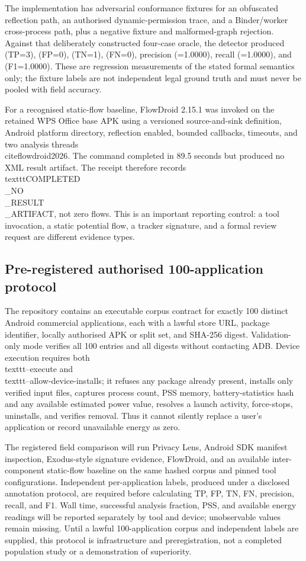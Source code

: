 The implementation has adversarial conformance fixtures for an obfuscated reflection path, an authorised dynamic-permission trace, and a Binder/worker cross-process path, plus a negative fixture and malformed-graph rejection. Against that deliberately constructed four-case oracle, the detector produced (TP=3), (FP=0), (TN=1), (FN=0), precision (=1.0000), recall (=1.0000), and (F1=1.0000). These are regression measurements of the stated formal semantics only; the fixture labels are not independent legal ground truth and must never be pooled with field accuracy.

For a recognised static-flow baseline, FlowDroid 2.15.1 was invoked on the retained WPS Office base APK using a versioned source-and-sink definition, Android platform directory, reflection enabled, bounded callbacks, timeouts, and two analysis threads \\cite{flowdroid2026}. The command completed in 89.5 seconds but produced no XML result artifact. The receipt therefore records \\texttt{COMPLETED\\_NO\\_RESULT\\_ARTIFACT}, not zero flows. This is an important reporting control: a tool invocation, a static potential flow, a tracker signature, and a formal review request are different evidence types.

\subsection{Pre-registered authorised 100-application protocol}

The repository contains an executable corpus contract for exactly 100 distinct Android commercial applications, each with a lawful store URL, package identifier, locally authorised APK or split set, and SHA-256 digest. Validation-only mode verifies all 100 entries and all digests without contacting ADB. Device execution requires both \\texttt{--execute} and \\texttt{--allow-device-installs}; it refuses any package already present, installs only verified input files, captures process count, PSS memory, battery-statistics hash and any available estimated power value, resolves a launch activity, force-stops, uninstalls, and verifies removal. Thus it cannot silently replace a user's application or record unavailable energy as zero.

The registered field comparison will run Privacy Lens, Android SDK manifest inspection, Exodus-style signature evidence, FlowDroid, and an available inter-component static-flow baseline on the same hashed corpus and pinned tool configurations. Independent per-application labels, produced under a disclosed annotation protocol, are required before calculating TP, FP, TN, FN, precision, recall, and F1. Wall time, successful analysis fraction, PSS, and available energy readings will be reported separately by tool and device; unobservable values remain missing. Until a lawful 100-application corpus and independent labels are supplied, this protocol is infrastructure and preregistration, not a completed population study or a demonstration of superiority.

